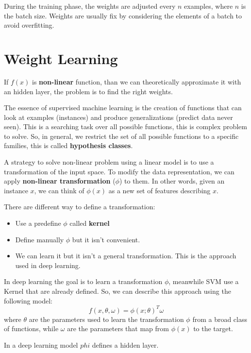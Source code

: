 \begin{note}
    During the training phase, the weights are adjusted every $n$ examples,
    where $n$ is the batch size. Weights are usually fix by considering the
    elements of a batch to avoid overfitting.
\end{note}
\section{Weight Learning}
If $f(x)$ is \textbf{non-linear} function, than we can theoretically approximate
it with an hidden layer, the problem is to find the right weights.

The essence of supervised machine learning is the creation of functions that
can look at examples (instances) and produce generalizations (predict data never seen).
This is a searching task over all possible functions, this is complex problem to
solve. So, in general, we restrict the set of all possible functions to a specific
families, this is called \textbf{hypothesis classes}.

A strategy to solve non-linear problem using a linear model is to use a
transformation of the input space. To modify the data representation, we can
apply \textbf{non-linear transformation} ($\phi$) to them. In other words, given
an instance $x$, we can think of $\phi(x)$ as a new set of features describing $x$.

There are different way to define a transformation:
\begin{itemize}
    \item Use a predefine $\phi$ called \textbf{kernel}
    \item Define manually $\phi$ but it isn't convenient.
    \item We can learn it but it isn't a general transformation. This is the
          approach used in deep learning.
\end{itemize}

In deep learning the goal is to learn a transformation $\phi$, meanwhile SVM use
a Kernel that are already defined. So, we can describe this approach using the
following model:
\begin{equation}
    f(x, \theta, \omega) = \phi(x; \theta)^T \omega
\end{equation}
where $\theta$ are the parameters used to learn the transformation $\phi$ from a
broad class of functions, while $\omega$ are the parameters that map from $\phi(x)$
to the target.

\begin{note}
    In a deep learning model $phi$ defines a hidden layer.
\end{note}

